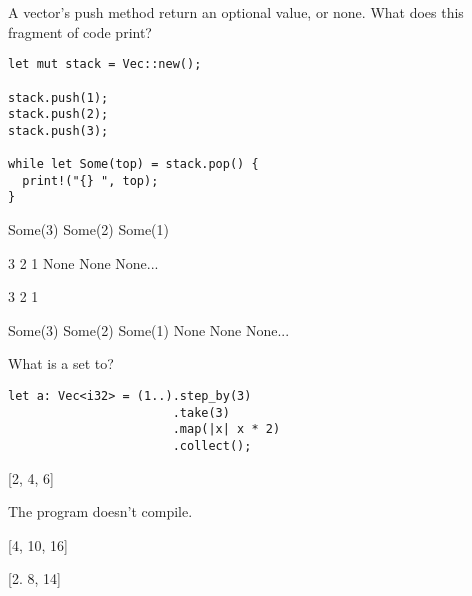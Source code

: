 \documentclass[11pt]{article} %
\newcommand*\choice{\item}
\begin{document}
\begin{multiplechoice}[choices=1]
A vector's push method return an optional value, or none. What does this fragment of code print?
\begin{lstlisting}
let mut stack = Vec::new();

stack.push(1);
stack.push(2);
stack.push(3);

while let Some(top) = stack.pop() {
  print!("{} ", top);
}
\end{lstlisting}
  \choice Some(3) Some(2) Some(1)
  \choice 3 2 1 None None None...
  \choice 3 2 1
  \choice Some(3) Some(2) Some(1) None None None...
\end{multiplechoice}


\begin{multiplechoice}[choices=1]
What is a set to?

\begin{lstlisting}
let a: Vec<i32> = (1..).step_by(3)
                       .take(3)
                       .map(|x| x * 2)
                       .collect();
\end{lstlisting}

  \choice {[2, 4, 6]}
  \choice The program doesn't compile.
  \choice {[4, 10, 16]}
  \choice {[2. 8, 14]}
\end{multiplechoice}
\end{document}
